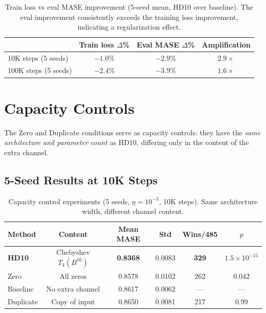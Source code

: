 \documentclass{article}
\begin{document}
\begin{table}[h]
\centering
\caption{Train loss vs eval MASE improvement (5-seed mean, HD10 over baseline). The eval improvement consistently exceeds the training loss improvement, indicating a regularization effect.}
\small
\begin{tabular}{lccc}
\toprule
& \textbf{Train loss $\Delta$\%} & \textbf{Eval MASE $\Delta$\%} & \textbf{Amplification} \\
\midrule
10K steps (5 seeds) & $-1.0\%$ & $-2.9\%$ & $2.9\times$ \\
100K steps (5 seeds) & $-2.4\%$ & $-3.9\%$ & $1.6\times$ \\
\bottomrule
\end{tabular}
\end{table}

\section{Capacity Controls}
\label{app:capacity}

The Zero and Duplicate conditions serve as capacity controls: they have the \emph{same architecture and parameter count} as HD10, differing only in the content of the extra channel.

\subsection{5-Seed Results at 10K Steps}

\begin{table}[h]
\centering
\caption{Capacity control experiments (5 seeds, $\eta = 10^{-3}$, 10K steps). Same architecture width, different channel content.}
\small
\begin{tabular}{lccccc}
\toprule
\textbf{Method} & \textbf{Content} & \textbf{Mean MASE} & \textbf{Std} & \textbf{Wins/485} & \textbf{$p$} \\
\midrule
\textbf{HD10} & Chebyshev $T_4(B^{16})$ & \textbf{0.8368} & 0.0083 & \textbf{329} & $1.5 \times 10^{-15}$ \\
Zero & All zeros & 0.8578 & 0.0102 & 262 & 0.042 \\
Baseline & No extra channel & 0.8617 & 0.0062 & --- & --- \\
Duplicate & Copy of input & 0.8650 & 0.0081 & 217 & 0.99 \\
\bottomrule
\end{tabular}
\end{table}
\end{document}
